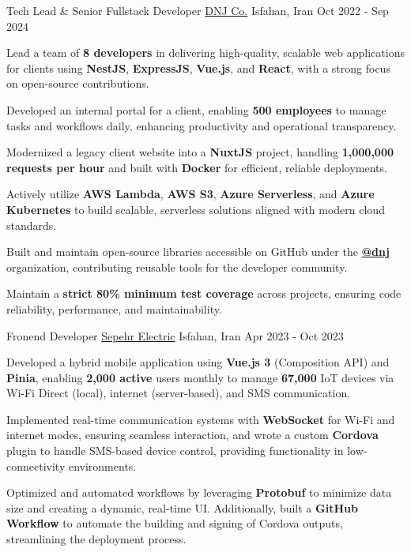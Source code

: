 
\begin{cventries}

  \cventry
    {Tech Lead \& Senior Fullstack Developer} %
    {\href{https://dnj.co.ir}{DNJ Co.}} %
    {Isfahan, Iran} %
    {Oct 2022 - Sep 2024} %
    {
      \begin{cvitems}
        \item {Lead a team of \textbf{8 developers} in delivering high-quality, scalable web applications for clients using \textbf{NestJS}, \textbf{ExpressJS}, \textbf{Vue.js}, and \textbf{React}, with a strong focus on open-source contributions.}
        \item {Developed an internal portal for a client, enabling \textbf{500 employees} to manage tasks and workflows daily, enhancing productivity and operational transparency.}
        \item {Modernized a legacy client website into a \textbf{NuxtJS} project, handling \textbf{1,000,000 requests per hour} and built with \textbf{Docker} for efficient, reliable deployments.}
        \item {Actively utilize \textbf{AWS Lambda}, \textbf{AWS S3}, \textbf{Azure Serverless}, and \textbf{Azure Kubernetes} to build scalable, serverless solutions aligned with modern cloud standards.}
        \item {Built and maintain open-source libraries accessible on GitHub under the \textbf{\href{https://github.com/dnj}{\faGithubSquare\acvHeaderIconSep @dnj}} organization, contributing reusable tools for the developer community.}
        \item {Maintain a \textbf{strict 80\% minimum test coverage} across projects, ensuring code reliability, performance, and maintainability.}
      \end{cvitems}
    }

  \cventry
    {Fronend Developer} %
    {\href{https://www.hinics.com/}{Sepehr Electric}} %
    {Isfahan, Iran} %
    {Apr 2023 - Oct 2023} %
    {
      \begin{cvitems}
        \item {Developed a hybrid mobile application using \textbf{Vue.js 3} (Composition API) and \textbf{Pinia}, enabling \textbf{2,000 active} users monthly to manage \textbf{67,000} IoT devices via Wi-Fi Direct (local), internet (server-based), and SMS communication.}
        \item {Implemented real-time communication systems with \textbf{WebSocket} for Wi-Fi and internet modes, ensuring seamless interaction, and wrote a custom \textbf{Cordova} plugin to handle SMS-based device control, providing functionality in low-connectivity environments.}
        \item {Optimized and automated workflows by leveraging \textbf{Protobuf} to minimize data size and creating a dynamic, real-time UI. Additionally, built a \textbf{GitHub Workflow} to automate the building and signing of Cordova outputs, streamlining the deployment process.}
      \end{cvitems}
    }
  


\end{cventries}
